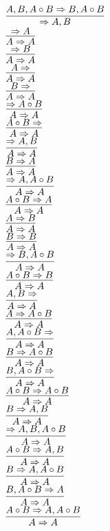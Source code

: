 \documentclass[11pt]{article}
\begin{document}
\begin{center}
\bigskip
\\$\infer{\Rightarrow A, B}{A, B, A\circ B\Rightarrow B, A\circ B}$
\bigskip
\\$\infer{A\Rightarrow A}{\Rightarrow A}$
\bigskip
\\$\infer{A\Rightarrow A}{\Rightarrow B}$
\bigskip
\\$\infer{A\Rightarrow A}{A\Rightarrow }$
\bigskip
\\$\infer{A\Rightarrow A}{B\Rightarrow }$
\bigskip
\\$\infer{A\Rightarrow A}{\Rightarrow A\circ B}$
\bigskip
\\$\infer{A\Rightarrow A}{A\circ B\Rightarrow }$
\bigskip
\\$\infer{A\Rightarrow A}{\Rightarrow A, B}$
\bigskip
\\$\infer{A\Rightarrow A}{B\Rightarrow A}$
\bigskip
\\$\infer{A\Rightarrow A}{\Rightarrow A, A\circ B}$
\bigskip
\\$\infer{A\Rightarrow A}{A\circ B\Rightarrow A}$
\bigskip
\\$\infer{A\Rightarrow A}{A\Rightarrow B}$
\bigskip
\\$\infer{A\Rightarrow A}{B\Rightarrow B}$
\bigskip
\\$\infer{A\Rightarrow A}{\Rightarrow B, A\circ B}$
\bigskip
\\$\infer{A\Rightarrow A}{A\circ B\Rightarrow B}$
\bigskip
\\$\infer{A\Rightarrow A}{A, B\Rightarrow }$
\bigskip
\\$\infer{A\Rightarrow A}{A\Rightarrow A\circ B}$
\bigskip
\\$\infer{A\Rightarrow A}{A, A\circ B\Rightarrow }$
\bigskip
\\$\infer{A\Rightarrow A}{B\Rightarrow A\circ B}$
\bigskip
\\$\infer{A\Rightarrow A}{B, A\circ B\Rightarrow }$
\bigskip
\\$\infer{A\Rightarrow A}{A\circ B\Rightarrow A\circ B}$
\bigskip
\\$\infer{A\Rightarrow A}{B\Rightarrow A, B}$
\bigskip
\\$\infer{A\Rightarrow A}{\Rightarrow A, B, A\circ B}$
\bigskip
\\$\infer{A\Rightarrow A}{A\circ B\Rightarrow A, B}$
\bigskip
\\$\infer{A\Rightarrow A}{B\Rightarrow A, A\circ B}$
\bigskip
\\$\infer{A\Rightarrow A}{B, A\circ B\Rightarrow A}$
\bigskip
\\$\infer{A\Rightarrow A}{A\circ B\Rightarrow A, A\circ B}$

\end{center}
\end{document}
